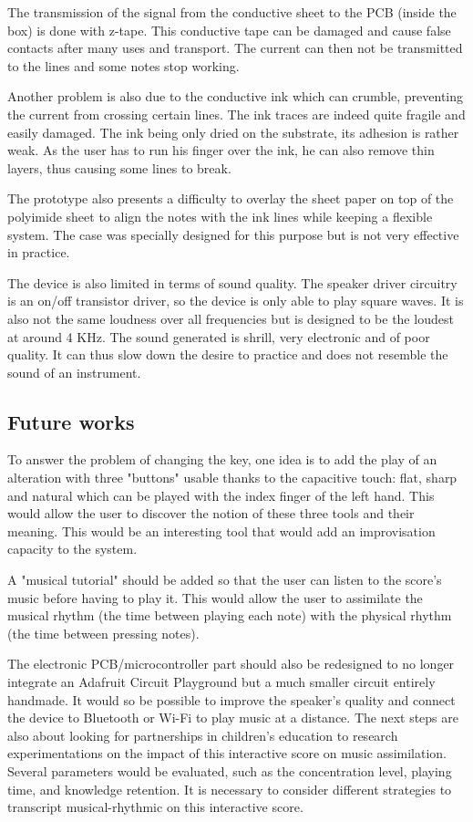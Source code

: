 The transmission of the signal from the conductive sheet to the PCB (inside the box) is done with z-tape. This conductive tape can be damaged and cause false contacts after many uses and transport. The current can then not be transmitted to the lines and some notes stop working. 

Another problem is also due to the conductive ink which can crumble, preventing the current from crossing certain lines. The ink traces are indeed quite fragile and easily damaged. The ink being only dried on the substrate, its adhesion is rather weak. As the user has to run his finger over the ink, he can also remove thin layers, thus causing some lines to break.

The prototype also presents a difficulty to overlay the sheet paper on top of the polyimide sheet to align the notes with the ink lines while keeping a flexible system. The case was specially designed for this purpose but is not very effective in practice. 

The device is also limited in terms of sound quality.
The speaker driver circuitry is an on/off transistor driver, so the device is only able to play square waves. It is also not the same loudness over all frequencies but is designed to be the loudest at around 4 KHz. The sound generated is shrill, very electronic and of poor quality. It can thus slow down the desire to practice and does not resemble the sound of an instrument.

\subsection{Future works}

To answer the problem of changing the key, one idea is to add the play of an alteration with three "buttons" usable thanks to the capacitive touch: flat, sharp and natural which can be played with the index finger of the left hand. This would allow the user to discover the notion of these three tools and their meaning. This would be an interesting tool that would add an improvisation capacity to the system.

A "musical tutorial" should be added so that the user can listen to the score's music before having to play it. This would allow the user to assimilate the musical rhythm (the time between playing each note) with the physical rhythm (the time between pressing notes).

The electronic PCB/microcontroller part should also be redesigned to no longer integrate an Adafruit Circuit Playground but a much smaller circuit entirely handmade. It would so be possible to
improve the speaker's quality and connect the device to Bluetooth or Wi-Fi to play music at a distance.
The next steps are also about looking for partnerships in children's education to research
experimentations on the impact of this interactive score on music assimilation. Several
parameters would be evaluated, such as the concentration level, playing time, and
knowledge retention. It is necessary to consider different strategies to transcript musical-rhythmic on this interactive score.